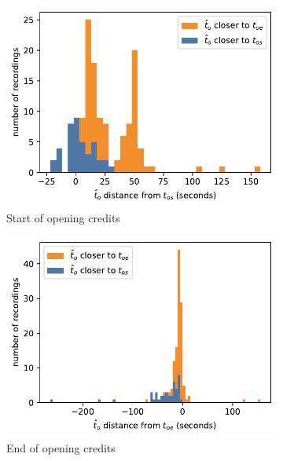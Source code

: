 \begin{figure}[h]
  \begin{subfigure}[t]{.49\textwidth}
    \centering
    \includegraphics[width=\linewidth]{../plots/distances/opt_l2_dist_start_first.pdf}
    \caption{Start of opening credits}
    \label{fig:t_diff_opt_os}
  \end{subfigure}
  \hfill
  \begin{subfigure}[t]{.49\textwidth}
    \centering
    \includegraphics[width=\linewidth]{../plots/distances/opt_l2_dist_start_last.pdf}
    \caption{End of opening credits}
    \label{fig:t_diff_opt_oe}
  \end{subfigure}
  \begin{subfigure}[t]{.49\textwidth}
      \centering

\end{subfigure}
\end{figure}
